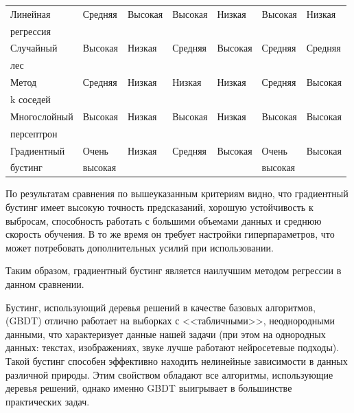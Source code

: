 \begin{table}[!h]
\begin{center}
\begin{tabular}{|l|l|l|l|l|l|l|}
\hline  Линейная        & Средняя  & Высокая            & Высокая           & Низкая                  & Высокая                                 & Низкая                                 \\
регрессия & & & & & & \\
\hline Случайный             & Высокая  & Низкая             & Средняя           & Высокая                 & Средняя                                 & Средняя                                 \\
лес & & & & & & \\
\hline  Метод           & Средняя  & Низкая             & Низкая            & Низкая                  & Средняя                                 & Высокая                                 \\
k соседей & & & & & & \\
\hline  Многослойный   & Высокая  & Низкая             & Высокая           & Низкая                  & Высокая                                 & Высокая                                 \\
персептрон & & & & & & \\
\hline Градиентный       & Очень  & Низкая             & Средняя           & Высокая                 & Очень                           & Высокая   \\                 
бустинг & высокая & & & & высокая & \\
\hline
	\end{tabular}
	\end{center}
\end{table}


По результатам сравнения по вышеуказанным критериям видно, что градиентный бустинг имеет высокую точность предсказаний, хорошую устойчивость к выбросам, способность работать с большими объемами данных и среднюю скорость обучения. В то же время он требует настройки гиперпараметров, что может потребовать дополнительных усилий при использовании.

Таким образом, градиентный бустинг является наилучшим методом регрессии в данном сравнении.

Бустинг, использующий деревья решений в качестве базовых алгоритмов, (GBDT) отлично работает на выборках с <<табличными>>, неоднородными данными, что характеризует данные нашей задачи (при этом на однородных данных: текстах, изображениях, звуке лучше работают нейросетевые подходы). Такой бустинг способен эффективно находить нелинейные зависимости в данных различной природы. Этим свойством обладают все алгоритмы, использующие деревья решений, однако именно GBDT выигрывает в большинстве практических задач. 
